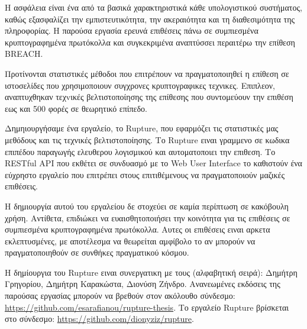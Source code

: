 \begin{abstractgr}

Η ασφάλεια είναι ένα από τα βασικά χαρακτηριστικά κάθε υπολογιστικού
συστήματος, καθώς εξασφαλίζει την εμπιστευτικότητα, την ακεραιότητα και τη διαθεσιμότητα
της πληροφορίας. Η παρούσα εργασία ερευνά επιθέσεις πάνω σε συμπιεσμένα
κρυπτογραφημένα πρωτόκολλα και συγκεκριμένα αναπτύσσει περαιτέρω την επίθεση BREACH.

Προτίνονται στατιστικές μέθοδοι που επιτρέπουν να πραγματοποιηθεί
η επίθεση σε ιστοσελίδες που χρησιμοποιουν συγχρονες κρυπτογραφικες
τεχνικες. Επιπλεον, αναπτυχθηκαν τεχvικές βελτιστοποίησης της επίθεσης που συντομεύουν
την επιθέση εως και 500 φορές σε θεωρητικό επίπεδο.

Δημηιουργήσαμε ένα εργαλείο, το Rupture, που εφαρμόζει τις στατιστικές μας μεθόδους και
τις τεχνικές βελτιστοποίησης. Το Rupture ειναι γραμμενο σε κωδικα επιπέδου παραγωγής 
ελευθερου λογισμικού και αυτοματοποιει την επιθεση. 
Το RESTful API που εκθέτει σε συνδυασμό με το Web User Interface το καθιστούν
ένα εύχρηστο εργαλείο που επιτρέπει στους επιτιθέμενους να πραγματοποιούν μαζικές 
επιθέσεις.

Η δημιουργία αυτού του εργαλείου δε στοχεύει σε καμία περίπτωση σε κακόβουλη χρήση.
Αντίθετα, επιδιώκει να ευαισθητοποιήσει την κοινότητα για τις επιθέσεις σε συμπιεσμένα
κρυπτογραφημένα πρωτόκολλα. Αυτες οι επιθέσεις ειναι αρκετα εκλεπτυσμένες, με αποτέλεσμα
να θεωρείται αμφίβολο το αν μπορούν να πραγματοποιηθούν σε συνθήκες πραγματικού κόσμου. 

Η δημίουργια του Rupture ειναι συνεργατικη με τους (αλφαβητική σειρά): Δημήτρη Γρηγορίου, 
Δημήτρη Καρακώστα, Διονύση Ζήνδρο.
Ανανεωμένες εκδόσεις της παρούσας εργασίας μπορούν να βρεθούν στον ακόλουθο
σύνδεσμο: \url{https://github.com/esarafianou/rupture-thesis}. Το εργαλείο
Rupture βρίσκεται στο σύνδεσμο: \url{https://github.com/dionyziz/rupture}.

\end{abstractgr}

